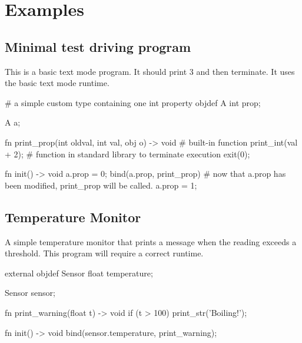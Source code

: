 \section{Examples}
\subsection{Minimal test driving program}
This is a basic text mode program. It should print 3 and then terminate.
It uses the basic text mode runtime.

\vspace{-0.5cm}
\begin{mylisting}
# a simple custom type containing one int property
objdef A
{
  int prop;
}

A a;

fn print_prop(int oldval, int val, obj o) -> void
{
  # built-in function
  print_int(val + 2);
  # function in standard library to terminate execution
  exit(0);
}

fn init() -> void
{
  a.prop = 0;
  bind(a.prop, print_prop)
  # now that a.prop has been modified, print_prop will be called.
  a.prop = 1;
}
\end{mylisting}

\subsection{Temperature Monitor}
A simple temperature monitor that prints a message when the reading exceeds a threshold.
This program will require a correct runtime.

\vspace{-0.5cm}
\begin{mylisting}
external objdef Sensor
{
  float temperature;
}

Sensor sensor;

fn print_warning(float t) -> void
{
  if (t > 100)
  {
    print_str('Boiling!');
  }
}

fn init() -> void
{
  bind(sensor.temperature, print_warning);
}
\end{mylisting}
